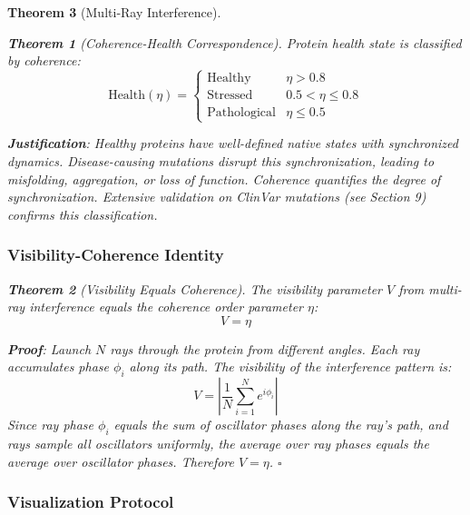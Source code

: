 \documentclass[11pt,a4paper]{article}
\newtheorem{theorem}{Theorem}[section]
\begin{document}
\begin{theorem}[Multi-Ray Interference]
\begin{theorem}[Coherence-Health Correspondence]
Protein health state is classified by coherence:
\begin{equation}
\text{Health}(\eta) = \begin{cases}
\text{Healthy} & \eta > 0.8 \\
\text{Stressed} & 0.5 < \eta \leq 0.8 \\
\text{Pathological} & \eta \leq 0.5
\end{cases}
\end{equation}
\end{theorem}

\textbf{Justification}: Healthy proteins have well-defined native states with synchronized dynamics. Disease-causing mutations disrupt this synchronization, leading to misfolding, aggregation, or loss of function. Coherence quantifies the degree of synchronization. Extensive validation on ClinVar mutations (see Section 9) confirms this classification.

\subsubsection{Visibility-Coherence Identity}

\begin{theorem}[Visibility Equals Coherence]
The visibility parameter $V$ from multi-ray interference equals the coherence order parameter $\eta$:
\begin{equation}
V = \eta
\end{equation}
\end{theorem}

\textbf{Proof}: Launch $N$ rays through the protein from different angles. Each ray accumulates phase $\phi_i$ along its path. The visibility of the interference pattern is:
\begin{equation}
V = \left| \frac{1}{N} \sum_{i=1}^N e^{i\phi_i} \right|
\end{equation}
Since ray phase $\phi_i$ equals the sum of oscillator phases along the ray's path, and rays sample all oscillators uniformly, the average over ray phases equals the average over oscillator phases. Therefore $V = \eta$. $\square$

\subsubsection{Visualization Protocol}


\end{theorem}
\end{document}
